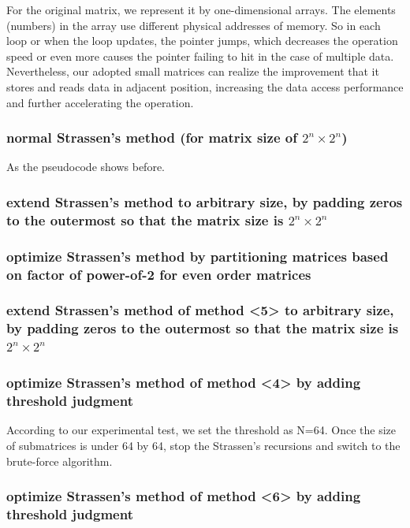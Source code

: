 \documentclass[UTF8]{ctexart}
\begin{document}
For the original matrix, we represent it by one-dimensional arrays. The elements (numbers) in the array use different physical addresses of memory. So in each loop or when the loop updates, the pointer jumps, which decreases the operation speed or even more causes the pointer failing to hit in the case of multiple data. Nevertheless, our adopted small matrices can realize the improvement that it stores and reads data in adjacent position, increasing the data access performance and further accelerating the operation.
\subsubsection{normal Strassen's method (for matrix size of \(2^n \times 2^n\))}

As the pseudocode shows before.
\subsubsection{extend Strassen's method to arbitrary size, by padding zeros
  to the outermost so that the matrix size is \(2^n\times 2^n\)}

\subsubsection{optimize Strassen's method by partitioning matrices based on
  factor of power-of-2 for even order matrices}

\subsubsection{extend Strassen's method of method \textless5\textgreater{} to
  arbitrary size, by padding zeros to the outermost so that the matrix
  size is \(2^n\times 2^n \)}

\subsubsection{optimize Strassen's method of method \textless4\textgreater{} by
  adding threshold judgment}
According to our experimental test, we set the threshold as N=64. Once
the size of submatrices is under 64 by 64, stop the Strassen's
recursions and switch to the brute-force algorithm.

\subsubsection{optimize Strassen's method of method \textless6\textgreater{} by
  adding threshold judgment}
\end{document}

